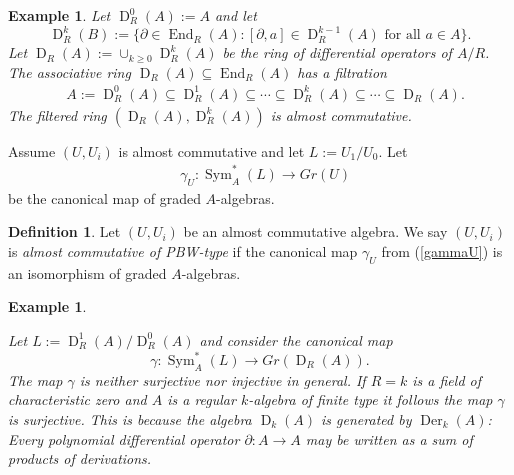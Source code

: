 \documentclass{amsart}
\theoremstyle{plain}
\newtheorem{example}[theorem]{Example}
\theoremstyle{definition}
\newtheorem{definition}[theorem]{Definition}
\theoremstyle{remark}
\numberwithin{equation}{theorem}
\begin{document}
\begin{example} 
Let ${\operatorname{D}}_{R}^0({A}):={A}$ and let
\[ {\operatorname{D}}_{R}^k(B):=\{ \partial \in {\operatorname{End} }_{R}({A}): [\partial , a]\in {\operatorname{D}}_{R}^{k-1}({A}) \text{ for all $a\in {A}$} \}. \]
Let ${\operatorname{D}}_{R}({A}):=\cup_{k\geq 0}{\operatorname{D}}_{R}^k({A})$ be the \emph{ring of differential operators of ${A}/{R}$}. 
The associative ring  ${\operatorname{D}}_{R}({A})\subseteq {\operatorname{End} }_{R}({A})$ has a filtration
\begin{align}
&\label{diff_filt}{A}:={\operatorname{D}}_{R}^0({A})\subseteq {\operatorname{D}}_{R}^1({A})\subseteq \cdots \subseteq 
{\operatorname{D}}_{R}^k({A})\subseteq \cdots \subseteq {\operatorname{D}}_{R}({A}) .
\end{align}
The filtered ring $({\operatorname{D}}_{R}({A}), {\operatorname{D}}_{R}^k({A}) )$ is almost commutative.
\end{example}

Assume $(U,U_i)$ is almost commutative and let  $L:= U_1/U_0$.
Let
\begin{align}
&\label{gammaU} \gamma_U:{\operatorname{Sym} }^*_{A}(L)\rightarrow Gr(U) 
\end{align}
be the canonical map of graded ${A}$-algebras.

\begin{definition} Let $(U,U_i)$ be an almost commutative algebra. We say $(U,U_i)$ is  \emph{almost commutative of PBW-type} if 
the canonical map $\gamma_U$ from (\ref{gammaU}) is an isomorphism of graded ${A}$-algebras.
\end{definition}

\begin{example} \label{diffII}

Let $L:={\operatorname{D}}^1_{R}({A})/{\operatorname{D}}^0_{R}({A})$ and consider the canonical map
\[ \gamma:{\operatorname{Sym} }^*_{A}(L)\rightarrow Gr({\operatorname{D}}_{R}({A})).\]
The map $\gamma$ is neither surjective nor injective in general. If ${R}=k$ is a field of characteristic zero
and ${A}$ is a regular $k$-algebra of finite type it follows the map $\gamma$ is surjective. This is because
the algebra ${\operatorname{D}}_k({A})$ is generated by ${\operatorname{Der} }_k({A})$: Every polynomial 
differential operator $\partial:{A}\rightarrow {A}$ may be written as a sum of products of derivations.
\end{example}
\end{document}
